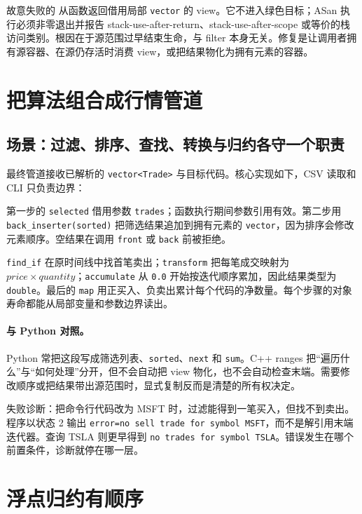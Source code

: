故意失败的  从函数返回借用局部 \texttt{vector} 的 view。它不进入绿色目标；ASan 执行必须非零退出并报告 stack-use-after-return、stack-use-after-scope 或等价的栈访问类别。根因在于源范围过早结束生命，与 filter 本身无关。修复是让调用者拥有源容器、在源仍存活时消费 view，或把结果物化为拥有元素的容器。

\section{把算法组合成行情管道}

\subsection{场景：过滤、排序、查找、转换与归约各守一个职责}

最终管道接收已解析的 \texttt{vector<Trade>} 与目标代码。核心实现如下，CSV 读取和 CLI 只负责边界：



第一步的 \texttt{selected} 借用参数 \texttt{trades}；函数执行期间参数引用有效。第二步用 \texttt{back\_inserter(sorted)} 把筛选结果追加到拥有元素的 \texttt{vector}，因为排序会修改元素顺序。空结果在调用 \texttt{front} 或 \texttt{back} 前被拒绝。

\texttt{find\_if} 在原时间线中找首笔卖出；\texttt{transform} 把每笔成交映射为 \(price \times quantity\)；\texttt{accumulate} 从 \texttt{0.0} 开始按迭代顺序累加，因此结果类型为 \texttt{double}。最后的 \texttt{map} 用正买入、负卖出累计每个代码的净数量。每个步骤的对象寿命都能从局部变量和参数边界读出。

\paragraph{与 Python 对照。}
Python 常把这段写成筛选列表、\texttt{sorted}、\texttt{next} 和 \texttt{sum}。C++ ranges 把“遍历什么”与“如何处理”分开，但不会自动把 view 物化，也不会自动检查末端。需要修改顺序或把结果带出源范围时，显式复制反而是清楚的所有权决定。

失败诊断：把命令行代码改为 MSFT 时，过滤能得到一笔买入，但找不到卖出。程序以状态 2 输出 \texttt{error=no sell trade for symbol MSFT}，而不是解引用末端迭代器。查询 TSLA 则更早得到 \texttt{no trades for symbol TSLA}。错误发生在哪个前置条件，诊断就停在哪一层。

\section{浮点归约有顺序}

